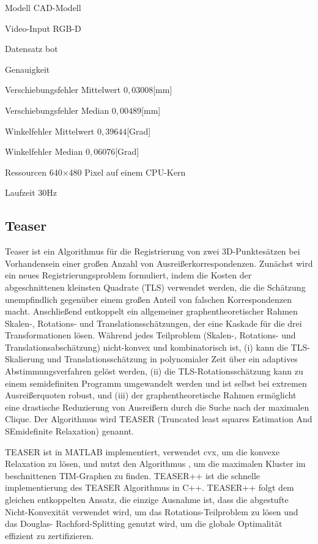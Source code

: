 \documentclass[a4paper, 11pt]{article}
\begin{document}
\begin{multicols*}{2}
    \begin{description*}
        \item[Modell] CAD-Modell
        \item[Video-Input] RGB-D
        \item[Datensatz] \Gls{bot}
        \item[Genauigkeit]
        \begin{itemize*}
            \item Verschiebungsfehler Mittelwert $0,03008$[mm]
            \item Verschiebungsfehler Median $0,00489$[mm]
            \item Winkelfehler Mittelwert $0,39644$[Grad]
            \item Winkelfehler Median $0,06076$[Grad]
        \end{itemize*}
        \item[Ressourcen] 640×480 Pixel auf einem CPU-Kern
        \item[Laufzeit] 30Hz
    \end{description*}

    \subsection{Teaser}
    Teaser\cite{Teaser++} ist ein Algorithmus für die Registrierung von zwei 3D-Punktesätzen bei Vorhandensein einer großen Anzahl von Ausreißerkorrespondenzen.
    Zunächst wird ein neues Registrierungsproblem formuliert, indem die Kosten der abgeschnittenen kleinsten Quadrate (TLS) verwendet werden, die die Schätzung unempfindlich gegenüber einem großen Anteil von falschen Korrespondenzen macht.
    Anschließend entkoppelt ein allgemeiner graphentheoretischer Rahmen Skalen-, Rotations- und Translationsschätzungen, der eine Kaskade für die drei Transformationen lösen. Während jedes Teilproblem (Skalen-, Rotations- und Translationsabschätzung) nicht-konvex und kombinatorisch ist,
    (i) kann die TLS-Skalierung und Translationsschätzung in polynomialer Zeit über ein adaptives Abstimmungsverfahren gelöst werden,
    (ii) die TLS-Rotationsschätzung kann zu einem semidefiniten Programm umgewandelt werden und ist selbst bei extremen Ausreißerquoten robust, und
    (iii) der graphentheoretische Rahmen ermöglicht eine drastische Reduzierung von Ausreißern durch die Suche nach der maximalen Clique.
    Der Algorithmus wird TEASER (Truncated least squares Estimation And SEmidefinite Relaxation) genannt.

    TEASER ist in MATLAB implementiert, verwendet cvx\cite{cvx}, um die konvexe Relaxation zu lösen, und nutzt den Algorithmus \cite{Mosek}, um die maximalen Kluster im beschnittenen TIM-Graphen zu finden. TEASER++ ist die schnelle implementierung des TEASER Algorithmus in C++. TEASER++ folgt dem gleichen entkoppelten Ansatz, die einzige Ausnahme ist, dass die abgestufte Nicht-Konvexität verwendet wird, um das Rotations-Teilproblem zu lösen und das Douglas- Rachford-Splitting genutzt wird, um die globale Optimalität effizient zu zertifizieren.


\end{multicols*}
\end{document}
